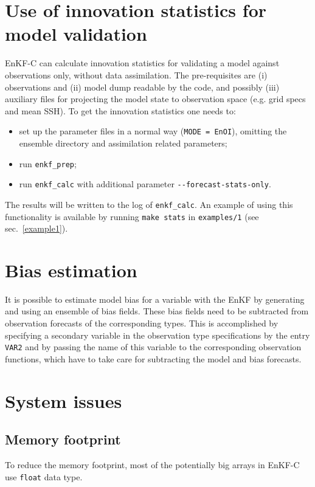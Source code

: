 \documentclass[11pt]{report}
\begin{document}
\section{Use of innovation statistics for model validation}

EnKF-C can calculate innovation statistics for validating a model against observations only, without data assimilation.
The pre-requisites are (i) observations and (ii) model dump readable by the code, and possibly (iii) auxiliary files for projecting the model state to observation space (e.g. grid specs and mean SSH).
To get the innovation statistics one needs to:
\begin{itemize}
\item set up the parameter files in a normal way (\verb|MODE = EnOI|), omitting the ensemble directory and assimilation related parameters;
\item run \verb|enkf_prep|;
\item run \verb|enkf_calc| with additional parameter \verb|--forecast-stats-only|.
\end{itemize}
The results will be written to the log of \verb|enkf_calc|. 
An example of using this functionality is available by running \verb|make stats| in \verb|examples/1| (see sec.~\ref{example1}).

\section{Bias estimation}

It is possible to estimate model bias for a variable with the EnKF by generating and using an ensemble of bias fields.
These bias fields need to be subtracted from observation forecasts of the corresponding types.
This is accomplished by specifying a secondary variable in the observation type specifications by the entry \verb|VAR2| and by passing the name of this variable to the corresponding observation functions, which have to take care for subtracting the model and bias forecasts.

\section{System issues}

\subsection{Memory footprint}

To reduce the memory footprint, most of the potentially big arrays in EnKF-C use \verb|float| data type.
\end{document}
